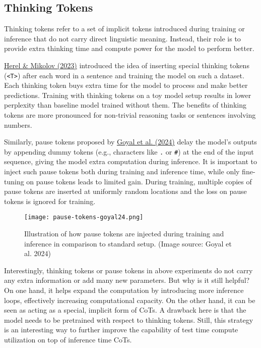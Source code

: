 \documentclass[12pt]{article}
\begin{document}
\subsection{Thinking Tokens}
Thinking tokens refer to a set of implicit tokens introduced during training or inference that do not carry direct linguistic meaning. Instead, their role is to provide extra thinking time and compute power for the model to perform better.

\href{https://arxiv.org/abs/2405.08644}{Herel \& Mikolov (2023)} introduced the idea of inserting special thinking tokens (\texttt{<T>}) after each word in a sentence and training the model on such a dataset. Each thinking token buys extra time for the model to process and make better predictions. Training with thinking tokens on a toy model setup results in lower perplexity than baseline model trained without them. The benefits of thinking tokens are more pronounced for non-trivial reasoning tasks or sentences involving numbers.

Similarly, pause tokens proposed by \href{https://arxiv.org/abs/2310.02226}{Goyal et al. (2024)} delay the model’s outputs by appending dummy tokens (e.g., characters like \texttt{.} or \texttt{\#}) at the end of the input sequence, giving the model extra computation during inference. It is important to inject such pause tokens both during training and inference time, while only fine-tuning on pause tokens leads to limited gain. During training, multiple copies of pause tokens are inserted at uniformly random locations and the loss on pause tokens is ignored for training.

\begin{figure}[h]
    \centering
    \texttt{[image: pause-tokens-goyal24.png]}
    \caption{Illustration of how pause tokens are injected during training and inference in comparison to standard setup. (Image source: Goyal et al. 2024)}
\end{figure}

Interestingly, thinking tokens or pause tokens in above experiments do not carry any extra information or add many new parameters. But why is it still helpful? On one hand, it helps expand the computation by introducing more inference loops, effectively increasing computational capacity. On the other hand, it can be seen as acting as a special, implicit form of CoTs. A drawback here is that the model needs to be pretrained with respect to thinking tokens. Still, this strategy is an interesting way to further improve the capability of test time compute utilization on top of inference time CoTs.
\end{document}
